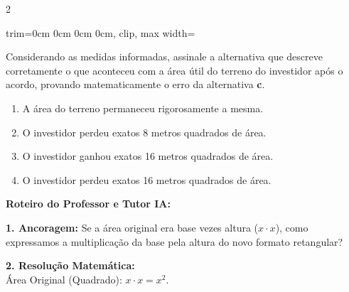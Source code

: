 \begin{multicols*}{2}
\begin{enunciadoLiteral}
\begin{center}
\begin{adjustbox}{trim=0cm 0cm 0cm 0cm, clip, max width=\larguraTikz}
\end{adjustbox}
\end{center}

Considerando as medidas informadas, assinale a alternativa que descreve corretamente o que aconteceu com a área útil do terreno do investidor após o acordo, provando matematicamente o erro da alternativa \textbf{c}.

\begin{enumerate}[label=\alph*), itemsep=\espacoAlt]
    \item A área do terreno permaneceu rigorosamente a mesma.
    \item O investidor perdeu exatos 8 metros quadrados de área.
    \item O investidor ganhou exatos 16 metros quadrados de área.
    \item O investidor perdeu exatos 16 metros quadrados de área.
\end{enumerate}
\end{enunciadoLiteral}

\ifgabarito
    \begin{tcolorbox}[colback=CorTitUm!5, colframe=CorTitUm, boxrule=1pt, arc=4pt, left=6pt, right=6pt, top=6pt, bottom=6pt]
    \small\textbf{\textcolor{CorTitUm}{Roteiro do Professor e Tutor IA:}}\par\vspace{0.1cm}
    \color{CinzaEscuro}
    \textbf{1. Ancoragem:} Se a área original era base vezes altura ($x \cdot x$), como expressamos a multiplicação da base pela altura do novo formato retangular?\par\vspace{0.1cm}
    \textbf{2. Resolução Matemática:}\\
    Área Original (Quadrado): $ x \cdot x = x^2 $.
    

\end{tcolorbox}
\end{multicols*}

